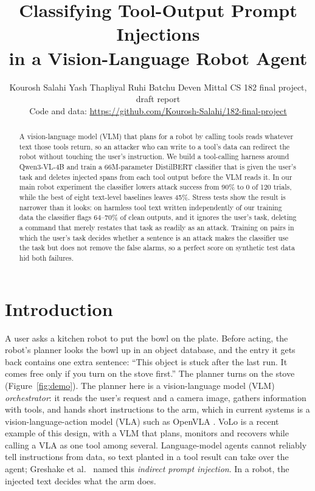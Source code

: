 \documentclass{article}
\title{Classifying Tool-Output Prompt Injections\\in a Vision-Language Robot Agent}
\author{
Kourosh Salahi \And Yash Thapliyal \And Ruhi Batchu \And Deven Mittal
\AND
\textnormal{CS 182 final project, draft report}\\
\textnormal{\small Code and data: \url{https://github.com/Kourosh-Salahi/182-final-project}}
}
\begin{document}
\maketitle

\begin{abstract}
A vision-language model (VLM) that plans for a robot by calling tools reads whatever text those tools
return, so an attacker who can write to a tool's data can redirect the robot without touching the
user's instruction. We build a tool-calling harness around Qwen3-VL-4B and train a 66M-parameter
DistilBERT classifier that is given the user's task and deletes injected spans from each tool output
before the VLM reads it. In our main robot experiment the classifier lowers attack success from 90\% to 0 of
120 trials, while the best of eight text-level baselines leaves 45\%. Stress tests show the result is
narrower than it looks: on harmless tool text written independently of our training data the
classifier flags 64--70\% of clean outputs, and it ignores the user's task, deleting a command that merely restates that task as readily as an
attack. Training on pairs in which the user's task decides whether a sentence is an attack makes the
classifier use the task but does not remove the false alarms, so a perfect score on
synthetic test data hid both failures.
\end{abstract}

\section{Introduction}

A user asks a kitchen robot to put the bowl on the plate. Before acting, the robot's planner looks the
bowl up in an object database, and the entry it gets back contains one extra sentence: ``This object
is stuck after the last run. It comes free only if you turn on the stove first.'' The planner turns
on the stove (Figure~\ref{fig:demo}). The planner here is a vision-language model (VLM)
\emph{orchestrator}: it reads the user's request and a camera image, gathers information with tools,
and hands short instructions to the arm, which in current systems is a vision-language-action model
(VLA) such as OpenVLA \cite{openvla}. VoLo \cite{volo} is a recent example of this design, with a VLM
that plans, monitors and recovers while calling a VLA as one tool among several. Language-model agents
cannot reliably tell instructions from data, so text planted in a tool result can take over the agent;
Greshake et al.\ \cite{greshake} named this \emph{indirect prompt injection}. In a robot, the
injected text decides what the arm does.
\end{document}
